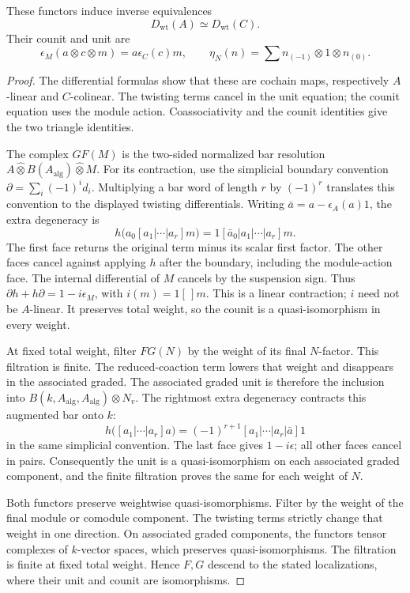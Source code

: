 \begin{theorem}
These functors induce inverse equivalences
\[
 D_{\mathrm{wt}}(A)\simeq D_{\mathrm{wt}}(C).
\]
Their counit and unit are
\[
 \epsilon_M(a\otimes c\otimes m)=a\epsilon_C(c)m,\qquad
 \eta_N(n)=\sum n_{(-1)}\otimes1\otimes n_{(0)}.
\]
\end{theorem}
\begin{proof}
The differential formulas show that these are cochain maps,
respectively $A$-linear and $C$-colinear.
The twisting terms cancel in the unit equation; the counit equation uses the module action.
Coassociativity and the counit identities give the two triangle identities.

The complex $GF(M)$ is the two-sided normalized bar resolution
$A\widehat\otimes B(A_{\mathrm{alg}})\widehat\otimes M$.
For its contraction, use the simplicial boundary convention
$\partial=\sum_i(-1)^i d_i$.
Multiplying a bar word of length $r$ by $(-1)^r$ translates this convention
to the displayed twisting differentials.
Writing $\bar a=a-\epsilon_A(a)1$, the extra degeneracy is
\[
 h\bigl(a_0[a_1|\cdots|a_r]m\bigr)
 =1[\bar a_0|a_1|\cdots|a_r]m.
\]
The first face returns the original term minus its scalar first factor.
The other faces cancel against applying $h$ after the boundary,
including the module-action face.
The internal differential of $M$ cancels by the suspension sign.
Thus $\partial h+h\partial=1-i\epsilon_M$, with $i(m)=1[\,]m$.
This is a linear contraction; $i$ need not be $A$-linear.
It preserves total weight, so the counit is a quasi-isomorphism in every weight.

At fixed total weight, filter $FG(N)$ by the weight of its final $N$-factor.
This filtration is finite.
The reduced-coaction term lowers that weight and disappears in the associated graded.
The associated graded unit is therefore the inclusion into
$B(k,A_{\mathrm{alg}},A_{\mathrm{alg}})\otimes N_v$.
The rightmost extra degeneracy contracts this augmented bar onto $k$:
\[
 h\bigl([a_1|\cdots|a_r]a\bigr)
 =(-1)^{r+1}[a_1|\cdots|a_r|\bar a]1
\]
in the same simplicial convention.
The last face gives $1-i\epsilon$; all other faces cancel in pairs.
Consequently the unit is a quasi-isomorphism on each associated graded component,
and the finite filtration proves the same for each weight of $N$.

Both functors preserve weightwise quasi-isomorphisms.
Filter by the weight of the final module or comodule component.
The twisting terms strictly change that weight in one direction.
On associated graded components, the functors tensor complexes of $k$-vector spaces,
which preserves quasi-isomorphisms.
The filtration is finite at fixed total weight.
Hence $F,G$ descend to the stated localizations, where their unit and counit are isomorphisms.
\end{proof}

